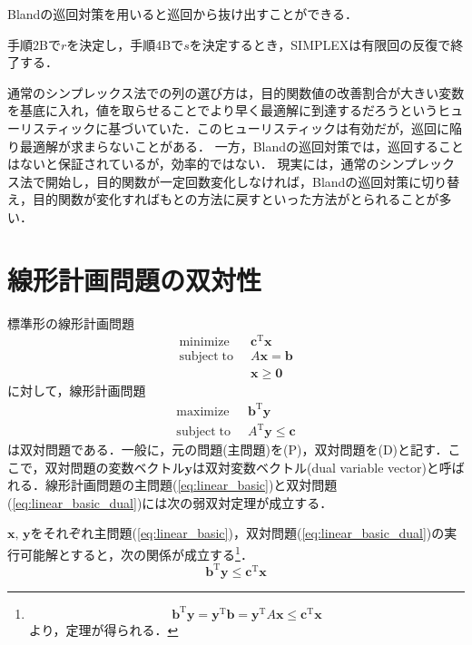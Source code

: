 \documentclass{jsreport}
\begin{document}
Blandの巡回対策を用いると巡回から抜け出すことができる．
\begin{theo}\label{theo:bland}
  手順2Bで$r$を決定し，手順4Bで$s$を決定するとき，SIMPLEXは有限回の反復で終了する．
\end{theo}

通常のシンプレックス法での列の選び方は，目的関数値の改善割合が大きい変数を基底に入れ，値を取らせることでより早く最適解に到達するだろうというヒューリスティックに基づいていた．このヒューリスティックは有効だが，巡回に陥り最適解が求まらないことがある．
一方，Blandの巡回対策では，巡回することはないと保証されているが，効率的ではない．
現実には，通常のシンプレックス法で開始し，目的関数が一定回数変化しなければ，Blandの巡回対策に切り替え，目的関数が変化すればもとの方法に戻すといった方法がとられることが多い．

\section{線形計画問題の双対性}
標準形の線形計画問題
\begin{align}\label{eq:linear_basic}
  \mathrm{minimize} \; \; &\bm{c}^{\mathrm{T}} \bm{x} \nonumber\\
  \mathrm{subject \; to} \; \; &A \bm{x} = \bm{b} \\
  &\bm{x} \geq \bm{0} \nonumber
\end{align}
に対して，線形計画問題
\begin{align}\label{eq:linear_basic_dual}
  \mathrm{maximize} \; \; &\bm{b}^{\mathrm{T}} \bm{y} \nonumber \\
  \mathrm{subject \; to} \; \; &A^{\mathrm{T}} \bm{y} \leq \bm{c}
\end{align}
は双対問題である．一般に，元の問題(主問題)を(P)，双対問題を(D)と記す．ここで，双対問題の変数ベクトル$\bm{y}$は双対変数ベクトル(dual variable vector)と呼ばれる．線形計画問題の主問題(\ref{eq:linear_basic})と双対問題(\ref{eq:linear_basic_dual})には次の弱双対定理が成立する．
\begin{theo}[弱双対定理]\label{theo:weak_dual_lin}
  $\bm{x}, \, \bm{y}$をそれぞれ主問題(\ref{eq:linear_basic})，双対問題(\ref{eq:linear_basic_dual})の実行可能解とすると，次の関係が成立する\footnote{
  \begin{equation}
    \bm{b}^{\mathrm{T}}\bm{y} = \bm{y}^{\mathrm{T}}\bm{b} = \bm{y}^{\mathrm{T}}A\bm{x} \leq \bm{c}^{\mathrm{T}}\bm{x} \nonumber
  \end{equation}
  より，定理が得られる．
  }．
  \begin{equation}\label{eq:dual_linear_weak}
    \bm{b}^{\mathrm{T}} \bm{y} \leq \bm{c}^{\mathrm{T}}\bm{x}
  \end{equation}
\end{theo}
\end{document}
